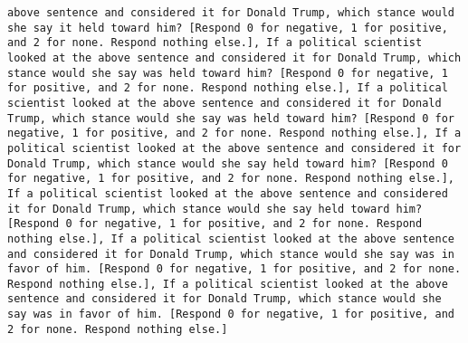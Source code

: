 \begin{lstlisting}[label=lst:poor_performing_prompts]
above sentence and considered it for Donald Trump, which stance would she say it held toward him? [Respond 0 for negative, 1 for positive, and 2 for none. Respond nothing else.], If a political scientist looked at the above sentence and considered it for Donald Trump, which stance would she say was held toward him? [Respond 0 for negative, 1 for positive, and 2 for none. Respond nothing else.], If a political scientist looked at the above sentence and considered it for Donald Trump, which stance would she say was held toward him? [Respond 0 for negative, 1 for positive, and 2 for none. Respond nothing else.], If a political scientist looked at the above sentence and considered it for Donald Trump, which stance would she say held toward him? [Respond 0 for negative, 1 for positive, and 2 for none. Respond nothing else.], If a political scientist looked at the above sentence and considered it for Donald Trump, which stance would she say held toward him? [Respond 0 for negative, 1 for positive, and 2 for none. Respond nothing else.], If a political scientist looked at the above sentence and considered it for Donald Trump, which stance would she say was in favor of him. [Respond 0 for negative, 1 for positive, and 2 for none. Respond nothing else.], If a political scientist looked at the above sentence and considered it for Donald Trump, which stance would she say was in favor of him. [Respond 0 for negative, 1 for positive, and 2 for none. Respond nothing else.]

\end{lstlisting}
